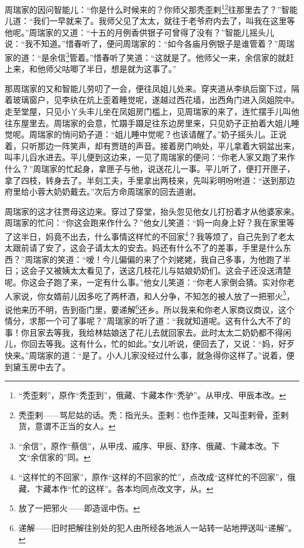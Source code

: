 \par 周瑞家的因问智能儿：“你是什么时候来的？你师父那秃歪剌\footnote{“秃歪剌”，原作“秃歪到”，俄藏、卞藏本作“秃驴”。从甲戌、甲辰本改。}\footnote{秃歪剌——骂尼姑的话。秃：指光头。歪剌：也作歪辣，又叫歪剌骨，歪剌货，意谓不正当的女人。}往那里去了？”智能儿道：“我们一早就来了。我师父见了太太，就往于老爷府内去了，叫我在这里等他呢。”周瑞家的又道：“十五的月例香供银子可曾得了没有？”智能儿摇头儿说：“我不知道。”惜春听了，便问周瑞家的：“如今各庙月例银子是谁管着？”周瑞家的道：“是余信\footnote{“余信”，原作“蔡信”，从甲戌、戚序、甲辰、舒序、俄藏、卞藏本改。下文“余信家的”同。}管着。”惜春听了笑道：“这就是了。他师父一来，余信家的就赶上来，和他师父咕唧了半日，想是就为这事了。”
\par 那周瑞家的又和智能儿劳叨了一会，便往凤姐儿处来。穿夹道从李纨后窗下过，隔着玻璃窗户，见李纨在炕上歪着睡觉呢，遂越过西花墙，出西角门进入凤姐院中。走至堂屋，只见小丫头丰儿坐在凤姐房门槛上，见周瑞家的来了，连忙摆手儿叫他往东屋里去。周瑞家的会意，忙蹑手蹑足往东边房里来，只见奶子正拍着大姐儿睡觉呢。周瑞家的悄问奶子道：“姐儿睡中觉呢？也该请醒了。”奶子摇头儿。正说着，只听那边一阵笑声，却有贾琏的声音。接着房门响处，平儿拿着大铜盆出来，叫丰儿舀水进去。平儿便到这边来，一见了周瑞家的便问：“你老人家又跑了来作什么？”周瑞家的忙起身，拿匣子与他，说送花儿一事。平儿听了，便打开匣子，拿了四枝，转身去了。半刻工夫，手里拿出两枝来，先叫彩明吩咐道：“送到那边府里给小蓉大奶奶戴去。”次后方命周瑞家的回去道谢。
\par 周瑞家的这才往贾母这边来。穿过了穿堂，抬头忽见他女儿打扮着才从他婆家来。周瑞家的忙问：“你这会跑来作什么？”他女儿笑道：“妈一向身上好？我在家里等了这半日，妈竟不出去，什么事情这样忙的不回家\footnote{“这样忙的不回家”，原作“这样的不回家的忙”，点改成“这样忙的不回家”，俄藏、卞藏本作“忙的这样”。各本均同点改文字，从。}？我等烦了，自己先到了老太太跟前请了安了，这会子请太太的安去。妈还有什么不了的差事，手里是什么东西？”周瑞家的笑道：“嗳！今儿偏偏的来了个刘姥姥，我自己多事，为他跑了半日；这会子又被姨太太看见了，送这几枝花儿与姑娘奶奶们。这会子还没送清楚呢。你这会子跑了来，一定有什么事。”他女儿笑道：“你老人家倒会猜。实对你老人家说，你女婿前儿因多吃了两杯酒，和人分争，不知怎的被人放了一把邪火\footnote{放了一把邪火——即造谣中伤。}，说他来历不明，告到衙门里，要递解\footnote{递解——旧时把解往别处的犯人由所经各地派人一站转一站地押送叫“递解”。}还乡。所以我来和你老人家商议商议，这个情分，求那一个可了事呢？”周瑞家的听了道：“我就知道呢。这有什么大不了的事！你且家去等我，我给林姑娘送了花儿去就回家去。此时太太二奶奶都不得闲儿，你回去等我。这有什么，忙的如此。”女儿听说，便回去了，又说：“妈，好歹快来。”周瑞家的道：“是了。小人儿家没经过什么事，就急得你这样了。”说着，便到黛玉房中去了。
